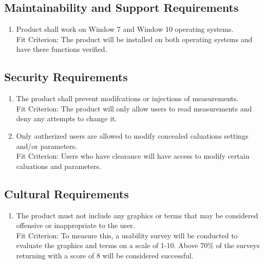 \documentclass[12pt, titlepage]{article}
\begin{document}
\subsection{Maintainability and Support Requirements}
\begin{adjustwidth}{2.2em}{0pt}
\begin{enumerate}[{NFR-M}1.] 
  \item Product shall work on Window 7 and Window 10 operating systems.\\
  Fit Criterion: The product will be installed on both operating systems and have there functions verified.
\end{enumerate} 
\end{adjustwidth}

\subsection{Security Requirements}
\begin{adjustwidth}{2.0em}{0pt}
\begin{enumerate}[{NFR-S}1.]
  \item The product shall prevent modifcations or injections of measurements.\\
  Fit Criterion: The product will only allow users to read measurements and deny any attempts to change it.
  \item Only autherized users are allowed to modify concealed caluations settings and/or parameters.\\
  Fit Criterion: Users who have clearance will have access to modify certain caluations and parameters.
\end{enumerate}
\end{adjustwidth}

\subsection{Cultural Requirements}
\begin{adjustwidth}{2.2em}{0pt}
\begin{enumerate}[{NFR-C}1.]
    \item The product must not include any graphics or terms that may be considered offensive or inappropriate to the user.\\
    Fit Criterion: To measure this, a usability survey will be conducted to evaluate the graphics and terms on a scale of 1-10. Above 70\% of the surveys returning with a score of 8 will be considered successful.
\end{enumerate}
\end{adjustwidth}
\end{document}
